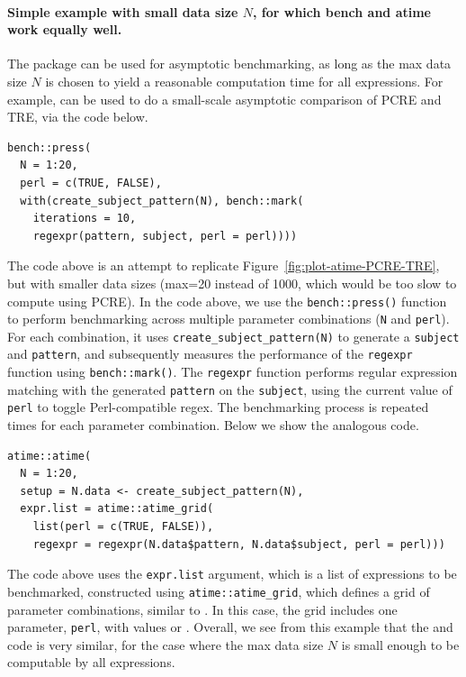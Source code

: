 \paragraph{Simple example with small data size $N$, for which bench and atime work equally well.}
The  package can be used for asymptotic benchmarking, as long as the max data size $N$ is chosen to yield a reasonable computation time for all expressions.
For example,  can be used to do a small-scale asymptotic comparison of PCRE and TRE, via the code below. 
\begin{Schunk}
\begin{verbatim}
bench::press(
  N = 1:20,
  perl = c(TRUE, FALSE),
  with(create_subject_pattern(N), bench::mark(
    iterations = 10,
    regexpr(pattern, subject, perl = perl))))
\end{verbatim}
\end{Schunk}
The code above is an attempt to replicate Figure~\ref{fig:plot-atime-PCRE-TRE}, but with smaller data sizes (max=20 instead of 1000, which would be too slow to compute using PCRE).
In the code above, we use the \texttt{bench::press()} function to perform benchmarking across multiple parameter combinations (\texttt{N} and \texttt{perl}).
For each combination, it uses \texttt{create\_subject\_pattern(N)} to generate a \texttt{subject} and \texttt{pattern}, and subsequently measures the performance of the \texttt{regexpr} function using \texttt{bench::mark()}. The \texttt{regexpr} function performs regular expression matching with the generated \texttt{pattern} on the \texttt{subject}, using the current value of \texttt{perl} to toggle Perl-compatible regex. 
The benchmarking process is repeated  times for each parameter combination.
Below we show the analogous  code. 
\begin{Schunk}
\begin{verbatim}
atime::atime(
  N = 1:20,
  setup = N.data <- create_subject_pattern(N),
  expr.list = atime::atime_grid(
    list(perl = c(TRUE, FALSE)),
    regexpr = regexpr(N.data$pattern, N.data$subject, perl = perl)))
\end{verbatim}
\end{Schunk}
The code above uses the \texttt{expr.list} argument, which is a list of expressions to be benchmarked, constructed using \texttt{atime::atime\_grid}, which defines a grid of parameter combinations, similar to . 
In this case, the grid includes one parameter, \texttt{perl}, with values  or . 
Overall, we see from this example that the  and  code is very similar, for the case where the max data size $N$ is small enough to be computable by all expressions.


